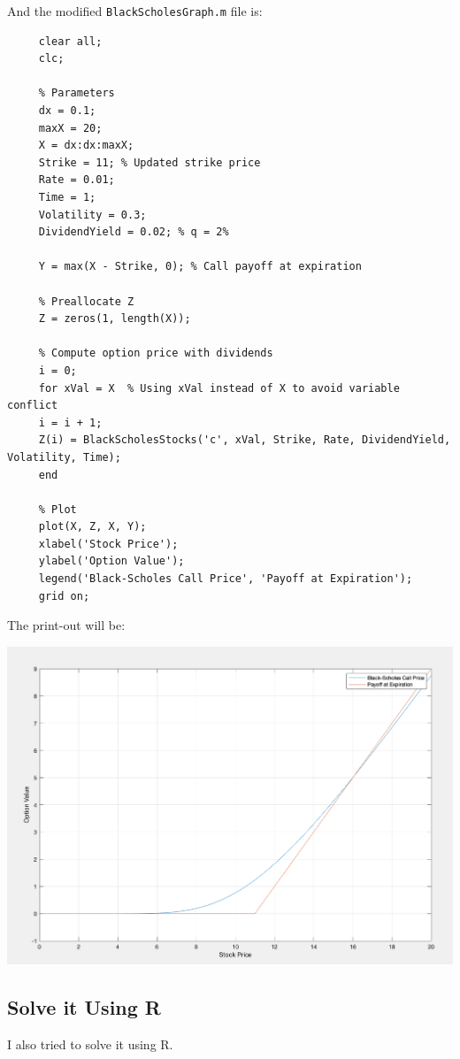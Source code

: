 \documentclass[letterpaper]{article}
\begin{document}
	And the modified \texttt{BlackScholesGraph.m} file is:
	
	\begin{lstlisting}
     clear all;
     clc;
     
     % Parameters
     dx = 0.1; 
     maxX = 20; 
     X = dx:dx:maxX; 
     Strike = 11; % Updated strike price
     Rate = 0.01;
     Time = 1;
     Volatility = 0.3;
     DividendYield = 0.02; % q = 2%
     
     Y = max(X - Strike, 0); % Call payoff at expiration
     
     % Preallocate Z
     Z = zeros(1, length(X));
     
     % Compute option price with dividends
     i = 0;
     for xVal = X  % Using xVal instead of X to avoid variable conflict
     i = i + 1;
     Z(i) = BlackScholesStocks('c', xVal, Strike, Rate, DividendYield, Volatility, Time);
     end
     
     % Plot
     plot(X, Z, X, Y);
     xlabel('Stock Price');
     ylabel('Option Value');
     legend('Black-Scholes Call Price', 'Payoff at Expiration');
     grid on;
	\end{lstlisting}
		
		The print-out will be:
		
		\includegraphics[max width=\textwidth, center]{Q1}
		\pagebreak
		\subsection{Solve it Using R}
		I also tried to solve it using R.
		
\end{document}
